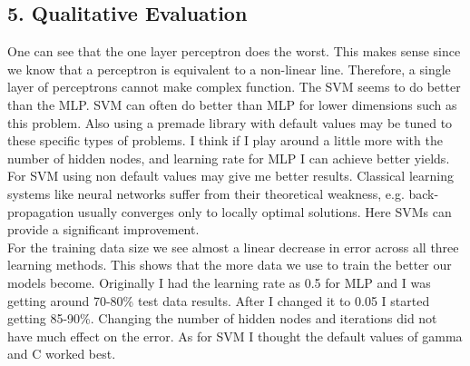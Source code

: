 
\subsection*{5. Qualitative Evaluation}
One can see that the one layer perceptron does the worst. This makes sense since we know that a perceptron is equivalent to a non-linear line. Therefore, a single layer of perceptrons cannot make complex function. The SVM seems to do better than the MLP. SVM can often do better than MLP for lower dimensions such as this problem. Also using a premade library with default values may be tuned to these specific types of problems. I think if I play around a little more with the number of hidden nodes, and learning rate for MLP I can achieve better yields. For SVM using non default values may give me better results. Classical learning systems like neural networks suffer from their theoretical weakness, e.g. back-propagation usually converges only to locally optimal solutions. Here SVMs can provide a significant improvement.\\
For the training data size we see almost a linear decrease in error across all three learning methods. This shows that the more data we use to train the better our models become. Originally I had the learning rate as 0.5 for MLP and I was getting around 70-80\% test data results. After I changed it to 0.05 I started getting 85-90\%. Changing the number of hidden nodes and iterations did not have much effect on the error. As for SVM I thought the default values of gamma and C worked best.